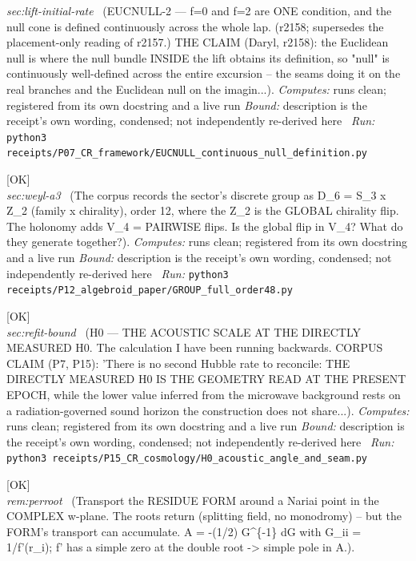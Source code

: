 \begin{description}
\textit{sec:lift-initial-rate} \ (EUCNULL-2 --- f=0 and f=2 are ONE condition, and the null cone is defined continuously across the whole lap. (r2158; supersedes the placement-only reading of r2157.) THE CLAIM (Daryl, r2158): the Euclidean null is where the null bundle INSIDE the lift obtains its definition, so "null" is continuously well-defined across the entire excursion -- the seams doing it on the real branches and the Euclidean null on the imagin...). 
\emph{Computes:} runs clean; registered from its own docstring and a live run
 \emph{Bound:} description is the receipt's own wording, condensed; not independently re-derived here
\ \emph{Run:} \texttt{python3 receipts/P07\_CR\_framework/EUCNULL\_continuous\_null\_definition.py}
\item[\label{rcpt:GROUP_full_order48}\texttt{GROUP\_full\_order48}]\hfill\textsf{[OK]}\\
\textit{sec:weyl-a3} \ (The corpus records the sector's discrete group as D\_6 = S\_3 x Z\_2 (family x chirality), order 12, where the Z\_2 is the GLOBAL chirality flip. The holonomy adds V\_4 = PAIRWISE flips. Is the global flip in V\_4? What do they generate together?). 
\emph{Computes:} runs clean; registered from its own docstring and a live run
 \emph{Bound:} description is the receipt's own wording, condensed; not independently re-derived here
\ \emph{Run:} \texttt{python3 receipts/P12\_algebroid\_paper/GROUP\_full\_order48.py}
\item[\label{rcpt:H0_acoustic_angle_and_seam}\texttt{H0\_acoustic\_angle\_and\_seam}]\hfill\textsf{[OK]}\\
\textit{sec:refit-bound} \ (H0 --- THE ACOUSTIC SCALE AT THE DIRECTLY MEASURED H0. The calculation I have been running backwards. CORPUS CLAIM (P7, P15): 'There is no second Hubble rate to reconcile: THE DIRECTLY MEASURED H0 IS THE GEOMETRY READ AT THE PRESENT EPOCH, while the lower value inferred from the microwave background rests on a radiation-governed sound horizon the construction does not share...). 
\emph{Computes:} runs clean; registered from its own docstring and a live run
 \emph{Bound:} description is the receipt's own wording, condensed; not independently re-derived here
\ \emph{Run:} \texttt{python3 receipts/P15\_CR\_cosmology/H0\_acoustic\_angle\_and\_seam.py}
\item[\label{rcpt:HOLONOMY_complex_loop}\texttt{HOLONOMY\_complex\_loop}]\hfill\textsf{[OK]}\\
\textit{rem:perroot} \ (Transport the RESIDUE FORM around a Nariai point in the COMPLEX w-plane. The roots return (splitting field, no monodromy) -- but the FORM's transport can accumulate. A = -(1/2) G\textasciicircum{}\{-1\} dG with G\_ii = 1/f'(r\_i); f' has a simple zero at the double root -> simple pole in A.). 

\end{description}
